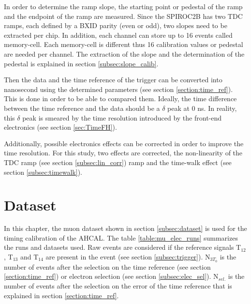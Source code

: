 In order to determine the ramp slope, the starting point or pedestal of the ramp and the endpoint of the ramp are measured. Since the SPIROC2B has two TDC ramps, each defined by a BXID parity (even or odd), two slopes need to be extracted per chip. In addition, each channel can store up to 16 events called memory-cell. Each memory-cell is different thus 16 calibration values or pedestal are needed per channel. The extraction of the slope and the determination of the pedestal is explained in section \ref{subsec:slope_calib}.

Then the data and the time reference of the trigger can be converted into nanosecond using the determined parameters (see section \ref{section:time_ref}). This is done in order to be able to compared them. Ideally, the time difference between the time reference and the data should be a $\delta$ peak at 0 ns. In reality, this $\delta$ peak is smeared by the time resolution introduced by the front-end electronics (see section \ref{sec:TimeFH}).

Additionally, possible electronics effects can be corrected in order to improve the time resolution. For this study, two effects are corrected, the non-linearity of the TDC ramp (see section \ref{subsec:lin_corr}) ramp and the time-walk effect (see section \ref{subsec:timewalk}).

\section{Dataset}

In this chapter, the muon dataset shown in section \ref{subsec:dataset} is used for the timing calibration of the AHCAL. The table \ref{table:mu_elec_runs} summarizes the runs and datasets used. Raw events are considered if the reference signals T$_{12}$, T$_{13}$ and T$_{14}$ are present in the event (see section \ref{subsec:trigger}). N$_{3 T_0}$ is the number of events after the selection on the time reference (see section \ref{section:time_ref}) or electron selection (see section \ref{subsec:elec_sel}). N$_{sel.}$ is the number of events after the selection on the error of the time reference that is explained in section \ref{section:time_ref}.

